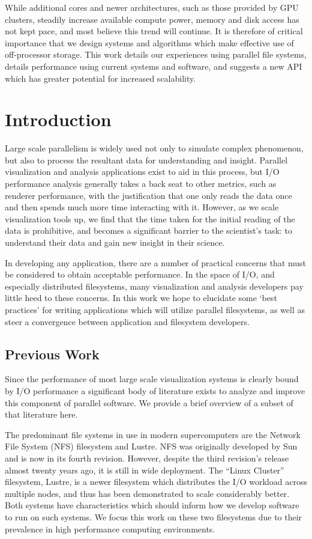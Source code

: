 While additional cores and newer architectures, such as those provided
by GPU clusters, steadily increase available compute power, memory
and disk access has not kept pace, and most believe this trend will
continue.  It is therefore of critical importance that we design
systems and algorithms which make effective use of off-processor
storage.  This work details our experiences using parallel file
systems, details performance using current systems and software,
and suggests a new API which has greater potential for increased
scalability.

\section{Introduction}

Large scale parallelism is widely used not only to simulate complex
phenomenon, but also to process the resultant data for understanding
and insight.  Parallel visualization and analysis applications exist
to aid in this process, but I/O performance analysis generally takes
a back seat to other metrics, such as renderer performance, with the
justification that one only reads the data once and then spends much
more time interacting with it.  However, as we scale visualization
tools up, we find that the time taken for the initial reading of
the data is prohibitive, and becomes a significant barrier to the
scientist's task: to understand their data and gain new insight in
their science.

In developing any application, there are a number of practical
concerns that must be considered to obtain acceptable performance.
In the space of I/O, and especially distributed filesystems, many
visualization and analysis developers pay little heed to these
concerns.  In this work we hope to elucidate some `best practices' for
writing applications which will utilize parallel filesystems, as well
as steer a convergence between application and filesystem developers.

\subsection{Previous Work}

Since the performance of most large scale visualization systems is
clearly bound by I/O performance a significant body of literature
exists to analyze and improve this component of parallel software.  We
provide a brief overview of a subset of that literature here.

The predominant file systems in use in modern supercomputers are the
Network File System (NFS) filesystem and Lustre.  NFS was originally
developed by Sun and is now in its fourth revision.  However, despite
the third revision's release almost twenty years
ago\cite{Callaghan:1995:NFSv3,Hildebrand:2004:NAHP}, it is still in
wide deployment.  The ``Linux Cluster'' filesystem,
Lustre\cite{Sun:2008:PSIW}, is a newer filesystem which distributes
the I/O workload across multiple nodes, and thus has been demonstrated
to scale considerably better.  Both systems have characteristics which
should inform how we develop software to run on such systems.  We focus
this work on these two filesystems due to their prevalence in high
performance computing environments.

